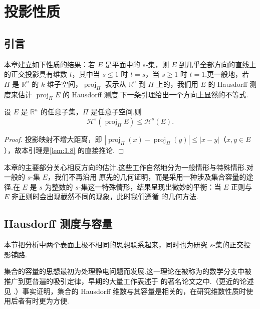 
\chapter{投影性质}\label{chap:6}

\section{引言}

本章建立如下性质的结果：若 $E$ 是平面中的 $s$-集，则 $E$ 到几乎全部方向的直线上的正交投影具有维数 $t$，其中当 $s\leq 1$ 时 $t=s$，当 $s\geq 1$ 时 $t=1$.更一般地，若 $\Pi$ 是 $\mathbb{R}^n$ 的 $k$ 维子空间，$\operatorname{proj}_{\Pi}$ 表示从 $\mathbb{R}^n$ 到 $\Pi$ 上的，我们用 $E$ 的 Hausdorff 测度来估计 $\operatorname{proj}_{\Pi}E$ 的 Hausdorff 测度.下一条引理给出一个方向上显然的不等式.

\begin{lemma}\label{lem:6.1}
设 $E$ 是 $\mathbb{R}^n$ 的任意子集，$\Pi$ 是任意子空间.则
\[
  \mathcal{H}^{s}(\operatorname{proj}_{\Pi}E)\leq\mathcal{H}^{s}(E).
\]
\end{lemma}

\begin{proof}
投影映射不增大距离，即 $|\operatorname{proj}_{\Pi}(x)-\operatorname{proj}_{\Pi}(y)|\leq|x-y|$（$x,y\in E$），故本引理是\cref{lem:1.8} 的直接推论.
\end{proof}

本章的主要部分关心相反方向的估计.这些工作自然地分为一般情形与特殊情形.对一般的 $s$-集 $E$，我们不再沿用 \textcite{marstrand1954a} 原先的几何证明，而是采用一种涉及集合容量的途径.在 $E$ 是 $s$ 为整数的 $s$-集这一特殊情形，结果呈现出微妙的平衡：当 $E$ 正则与 $E$ 非正则时会出现截然不同的现象，此时我们遵循 \textcite{besicovitch1939} 的几何方法.

\section{Hausdorff 测度与容量}

本节把分析中两个表面上极不相同的思想联系起来，同时也为研究 $s$-集的正交投影铺路.

集合的容量的思想最初为处理静电问题而发展.这一理论在被称为的数学分支中被推广到更普遍的吸引定律，早期的大量工作表述于 \textcite{frostman1935} 的著名论文之中.（更近的论述见 \textcites{taylor1961,carleson1967,haymankennedy1976,hille1973}.）事实证明，集合的 Hausdorff 维数与其容量是相关的，在研究维数性质时使用后者有时更为方便.

